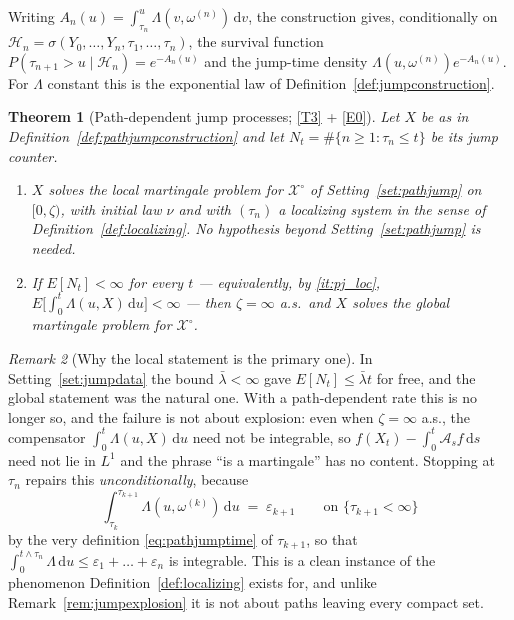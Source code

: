 \documentclass[11pt,a4paper]{article}
\theoremstyle{plain}
\newtheorem{theorem}{Theorem}[section]
\theoremstyle{definition}
\theoremstyle{remark}
\newtheorem{remark}[theorem]{Remark}
\newcommand{\XX}{\mathcal{X}}                  %
\newcommand{\dif}{\,\mathrm{d}}
\begin{document}
Writing $A_n(u) = \int_{\tau_n}^{u}\Lambda(v,\omega^{(n)})\dif v$, the construction
gives, conditionally on $\mathcal{H}_n = \sigma(Y_0,\dots,Y_n,\tau_1,\dots,\tau_n)$,
the survival function $P(\tau_{n+1}>u \mid \mathcal{H}_n) = e^{-A_n(u)}$ and the
jump-time density $\Lambda(u,\omega^{(n)})e^{-A_n(u)}$.  For $\Lambda$ constant
this is the exponential law of Definition~\ref{def:jumpconstruction}.

\begin{theorem}[Path-dependent jump processes; \eqref{T3} + \eqref{E0}]
  \label{thm:pathjumpMP}
  Let $X$ be as in Definition~\ref{def:pathjumpconstruction} and let
  $N_t = \#\{n \geq 1 : \tau_n \leq t\}$ be its jump counter.
  \begin{enumerate}[label=(\alph*)]
  \item \label{it:pj_loc}
    $X$ solves the \emph{local} martingale problem for $\XX^\circ$ of
    Setting~\ref{set:pathjump} on $[0,\zeta)$, with initial law $\nu$ and with
    $(\tau_n)$ a localizing system in the sense of
    Definition~\ref{def:localizing}.  No hypothesis beyond
    Setting~\ref{set:pathjump} is needed.
  \item \label{it:pj_glob}
    If $E[N_t] < \infty$ for every $t$ --- equivalently, by \ref{it:pj_loc},
    $E\bigl[\int_0^t \Lambda(u,X)\dif u\bigr] < \infty$ --- then $\zeta = \infty$
    a.s.\ and $X$ solves the \emph{global} martingale problem for $\XX^\circ$.
  \end{enumerate}
\end{theorem}

\begin{remark}[Why the local statement is the primary one]
  \label{rem:pathjumpprimary}
  In Setting~\ref{set:jumpdata} the bound $\bar\lambda < \infty$ gave
  $E[N_t] \leq \bar\lambda t$ for free, and the global statement was the natural
  one.  With a path-dependent rate this is no longer so, and the failure is not
  about explosion: even when $\zeta = \infty$ a.s., the compensator
  $\int_0^t \Lambda(u,X)\dif u$ need not be integrable, so
  $f(X_t) - \int_0^t \mathcal{A}_sf \dif s$ need not lie in $L^1$ and the phrase
  ``is a martingale'' has no content.  Stopping at $\tau_n$ repairs this
  \emph{unconditionally}, because
  \begin{equation}
    \label{eq:compensatorexp}
    \int_{\tau_k}^{\tau_{k+1}} \Lambda(u,\omega^{(k)}) \dif u \;=\; \varepsilon_{k+1}
    \qquad \text{on } \{\tau_{k+1} < \infty\}
  \end{equation}
  by the very definition \eqref{eq:pathjumptime} of $\tau_{k+1}$, so that
  $\int_0^{t \wedge \tau_n} \Lambda \dif u \leq \varepsilon_1 + \dots + \varepsilon_n$
  is integrable.  This is a clean instance of the phenomenon
  Definition~\ref{def:localizing} exists for, and unlike
  Remark~\ref{rem:jumpexplosion} it is not about paths leaving every compact set.
\end{remark}
\end{document}
